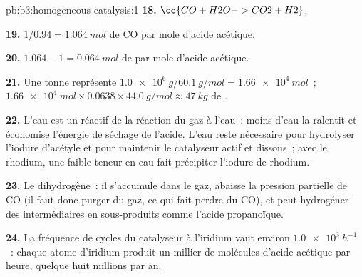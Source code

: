 \begin{solution}{pb:b3:homogeneous-catalysis:1}
\textbf{18.} $\ce{CO + H2O -> CO2 + H2}$.

\textbf{19.} $1/0.94 = \qty{1.064}{mol}$ de CO par mole d'acide acétique.

\textbf{20.} $1.064 - 1 = \qty{0.064}{mol}$ de  par mole d'acide acétique.

\textbf{21.} Une tonne représente $\qty{1.0e6}{g}/\qty{60.1}{g/mol} = \qty{1.66e4}{mol}$~; $\qty{1.66e4}{mol} \times 0.0638 \times \qty{44.0}{g/mol} \approx \qty{47}{kg}$ de .

\textbf{22.} L'eau est un réactif de la réaction du gaz à l'eau~: moins
d'eau la ralentit et économise l'énergie de séchage de l'acide. L'eau reste
nécessaire pour hydrolyser l'iodure d'acétyle et pour maintenir le
catalyseur actif et dissous~; avec le rhodium, une faible teneur en eau
fait précipiter l'iodure de rhodium.

\textbf{23.} Le dihydrogène~: il s'accumule dans le gaz, abaisse la
pression partielle de CO (il faut donc purger du gaz, ce qui fait perdre du
CO), et peut hydrogéner des intermédiaires en sous-produits comme l'acide
propanoïque.

\textbf{24.} La fréquence de cycles du catalyseur à l'iridium vaut environ $\qty{1.0e3}{h^{-1}}$~: chaque atome d'iridium produit
un millier de molécules d'acide acétique par heure, quelque huit millions
par an.
\end{solution}
